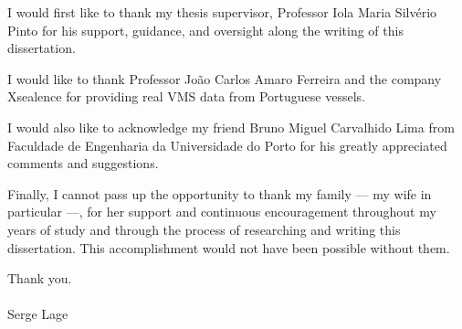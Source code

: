 \acknowledgements

I would first like to thank my thesis supervisor, Professor Iola Maria Silvério Pinto for his support, guidance, and oversight along the writing of this dissertation.

I would like to thank Professor João Carlos Amaro Ferreira and the company Xsealence for providing real VMS data from Portuguese vessels.

I would also like to acknowledge my friend Bruno Miguel Carvalhido Lima from Faculdade de Engenharia da Universidade do Porto for his greatly appreciated comments and suggestions.

Finally, I cannot pass up the opportunity to thank my family — my wife in
particular —, for her support and continuous encouragement throughout my years of study and through the process of researching and writing this dissertation. This accomplishment would not have been possible without them.

Thank you.
\\\\
Serge Lage

